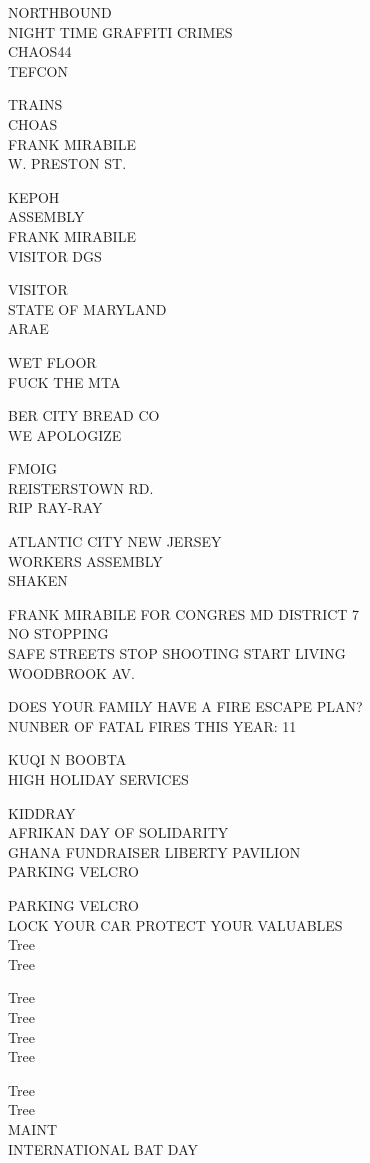 \documentclass[10pt,letterpaper]{article}
\begin{document}
NORTHBOUND\\
NIGHT TIME GRAFFITI CRIMES\\
CHAOS44\\
TEFCON

TRAINS\\
CHOAS\\
FRANK MIRABILE\\
W. PRESTON ST.

KEPOH\\
ASSEMBLY\\
FRANK MIRABILE\\
VISITOR DGS

VISITOR\\
STATE OF MARYLAND\\
ARAE

WET FLOOR\\
FUCK THE MTA

BER CITY BREAD CO\\
WE APOLOGIZE

FMOIG\\
REISTERSTOWN RD.\\
RIP RAY{-}RAY

ATLANTIC CITY NEW JERSEY\\
WORKERS ASSEMBLY\\
SHAKEN

FRANK MIRABILE FOR CONGRES MD DISTRICT 7\\
NO STOPPING\\
SAFE STREETS STOP SHOOTING START LIVING\\
WOODBROOK AV.

DOES YOUR FAMILY HAVE A FIRE ESCAPE PLAN?\\
NUNBER OF FATAL FIRES THIS YEAR: 11

KUQI N BOOBTA\\
HIGH HOLIDAY SERVICES

KIDDRAY\\
AFRIKAN DAY OF SOLIDARITY\\
GHANA FUNDRAISER LIBERTY PAVILION\\
PARKING VELCRO

PARKING VELCRO\\
LOCK YOUR CAR PROTECT YOUR VALUABLES\\
Tree\\
Tree

Tree\\
Tree\\
Tree\\
Tree

Tree\\
Tree\\
MAINT\\
INTERNATIONAL BAT DAY
\end{document}
